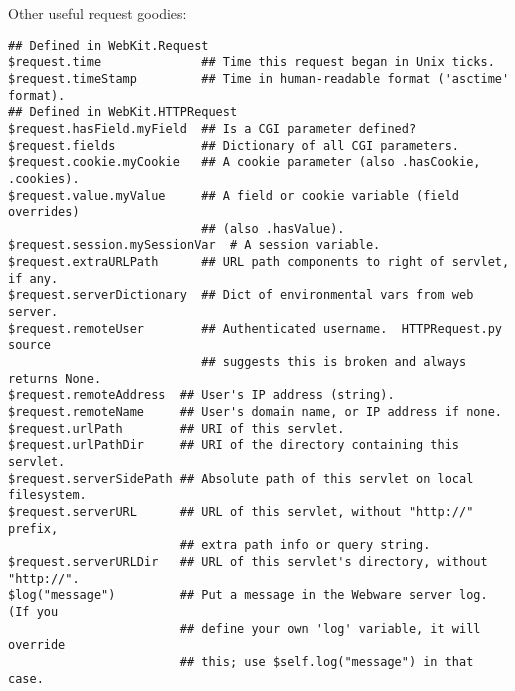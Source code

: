 Other useful request goodies:
\begin{verbatim}
## Defined in WebKit.Request
$request.time              ## Time this request began in Unix ticks.
$request.timeStamp         ## Time in human-readable format ('asctime' format).
## Defined in WebKit.HTTPRequest
$request.hasField.myField  ## Is a CGI parameter defined?
$request.fields            ## Dictionary of all CGI parameters.
$request.cookie.myCookie   ## A cookie parameter (also .hasCookie, .cookies).
$request.value.myValue     ## A field or cookie variable (field overrides)
                           ## (also .hasValue).
$request.session.mySessionVar  # A session variable.
$request.extraURLPath      ## URL path components to right of servlet, if any.
$request.serverDictionary  ## Dict of environmental vars from web server.
$request.remoteUser        ## Authenticated username.  HTTPRequest.py source
                           ## suggests this is broken and always returns None.
$request.remoteAddress  ## User's IP address (string).
$request.remoteName     ## User's domain name, or IP address if none.
$request.urlPath        ## URI of this servlet.
$request.urlPathDir     ## URI of the directory containing this servlet.
$request.serverSidePath ## Absolute path of this servlet on local filesystem.
$request.serverURL      ## URL of this servlet, without "http://" prefix,
                        ## extra path info or query string.
$request.serverURLDir   ## URL of this servlet's directory, without "http://".
$log("message")         ## Put a message in the Webware server log.  (If you
                        ## define your own 'log' variable, it will override
                        ## this; use $self.log("message") in that case.
\end{verbatim}




